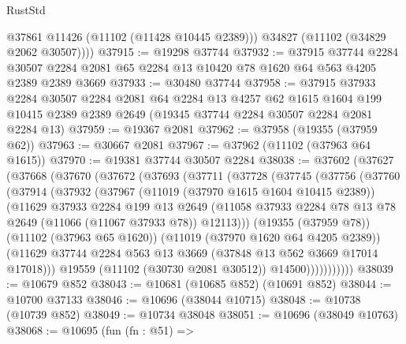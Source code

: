 \begin{lexlean}{RustStd}
\begin{coremodule}
          @37861
          @11426
          (@11102 (@11428 @10445 @2389)))
        @34827
        (@11102 (@34829 @2062 @30507))))
@37915 := @19298 @37744
@37932 := @37915
    @37744
    @2284
    @30507
    @2284
    @2081
    @65
    @2284
    @13
    @10420
    @78
    @1620
    @64
    @563
    @4205
    @2389
    @2389
    @3669
@37933 := @30480 @37744
@37958 := @37915
    @37933
    @2284
    @30507
    @2284
    @2081
    @64
    @2284
    @13
    @4257
    @62
    @1615
    @1604
    @199
    @10415
    @2389
    @2389
    @2649
    (@19345 @37744 @2284 @30507 @2284 @2081 @2284 @13)
@37959 := @19367 @2081
@37962 := @37958 (@19355 (@37959 @62))
@37963 := @30667 @2081
@37967 := @37962 (@11102 (@37963 @64 @1615))
@37970 := @19381 @37744 @30507 @2284
@38038 := @37602
    (@37627
      (@37668
        (@37670
          (@37672
            (@37693
              (@37711
                (@37728
                  (@37745
                    (@37756
                      (@37760
                        (@37914
                          (@37932
                            (@37967
                              (@11019 (@37970 @1615 @1604 @10415 @2389))
                              (@11629
                                @37933
                                @2284
                                @199
                                @13
                                @2649
                                (@11058
                                  @37933
                                  @2284
                                  @78
                                  @13
                                  @78
                                  @2649
                                  (@11066 (@11067 @37933 @78))
                                  @12113)))
                            (@19355 (@37959 @78))
                            (@11102 (@37963 @65 @1620))
                            (@11019 (@37970 @1620 @64 @4205 @2389))
                            (@11629
                              @37744
                              @2284
                              @563
                              @13
                              @3669
                              (@37848 @13 @562 @3669 @17014 @17018)))
                          @19559
                          (@11102 (@30730 @2081 @30512))
                          @14500)))))))))))
@38039 := @10679 @852
@38043 := @10681 (@10685 @852) (@10691 @852)
@38044 := @10700 @37133
@38046 := @10696 (@38044 @10715)
@38048 := @10738 (@10739 @852)
@38049 := @10734 @38048
@38051 := @10696 (@38049 @10763)
@38068 := @10695
    (fun (fn : @51) =>

\end{coremodule}
\end{lexlean}
